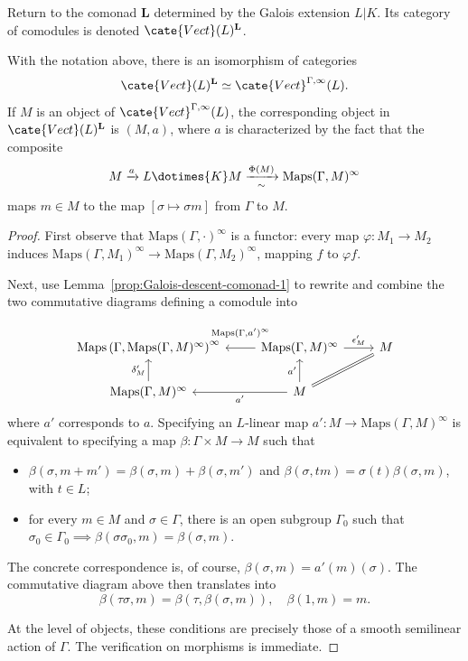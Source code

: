 Return to the comonad $\mathbf{L}$ determined by the Galois extension $L|K$.
Its category of comodules is denoted $\cate{Vect}(L)^{\mathbf{L}}$.

\begin{lemma}\label{prop:Galois-descent-aux}
	With the notation above, there is an isomorphism of categories
	\[ \cate{Vect}(L)^{\mathbf{L}} \simeq \cate{Vect}^{\Gamma, \infty}(L). \]
	If $M$ is an object of $\cate{Vect}^{\Gamma,\infty}(L)$, the
	corresponding object in $\cate{Vect}(L)^{\mathbf{L}}$ is $(M,a)$, where
	$a$ is characterized by the fact that the composite
	\[ M \xrightarrow{a} L \dotimes{K} M \xrightarrow[\sim]{\Phi(M)} \mathrm{Maps}(\Gamma, M)^\infty \]
	maps $m\in M$ to the map $[\sigma\mapsto\sigma m]$ from $\Gamma$ to $M$.
\end{lemma}
\begin{proof}
	First observe that $\mathrm{Maps}(\Gamma,\mathord\cdot)^\infty$ is a
	functor: every map $\varphi:M_1\to M_2$ induces
	$\mathrm{Maps}(\Gamma,M_1)^\infty\to
	\mathrm{Maps}(\Gamma,M_2)^\infty$, mapping $f$ to $\varphi f$.

	Next, use Lemma~\ref{prop:Galois-descent-comonad-1} to rewrite and combine
	the two commutative diagrams defining a comodule into
	\[\begin{tikzcd}
		\mathrm{Maps}\left( \Gamma, \mathrm{Maps}(\Gamma, M)^\infty \right)^\infty & \mathrm{Maps}(\Gamma, M)^\infty \arrow[l, "{\mathrm{Maps}(\Gamma, a')^\infty }"' inner sep=0.8em] \arrow[r, "{\epsilon'_M}"] & M \\
		\mathrm{Maps}(\Gamma, M)^\infty \arrow[u, "{\delta'_M}"] & M \arrow[l, "{a'}"] \arrow[u, "{a'}"] \arrow[equal, ru] &
	\end{tikzcd}\]
	where $a'$ corresponds to $a$. Specifying an $L$-linear map
	$a':M\to\mathrm{Maps}(\Gamma,M)^\infty$ is equivalent to specifying a
	map $\beta:\Gamma\times M\to M$ such that
	\begin{itemize}
		\item $\beta(\sigma,m+m')=\beta(\sigma,m)+\beta(\sigma,m')$ and
		$\beta(\sigma,tm)=\sigma(t)\beta(\sigma,m)$, with $t\in L$;
		\item for every $m\in M$ and $\sigma\in\Gamma$, there is an open
		subgroup $\Gamma_0$ such that
		$\sigma_0\in\Gamma_0\implies
		\beta(\sigma\sigma_0,m)=\beta(\sigma,m)$.
	\end{itemize}
	The concrete correspondence is, of course,
	$\beta(\sigma,m)=a'(m)(\sigma)$. The commutative diagram above then
	translates into
	\[ \beta(\tau\sigma, m) = \beta(\tau, \beta(\sigma, m)), \quad \beta(1, m) = m. \]

	At the level of objects, these conditions are precisely those of a smooth
	semilinear action of $\Gamma$. The verification on morphisms is immediate.
\end{proof}

